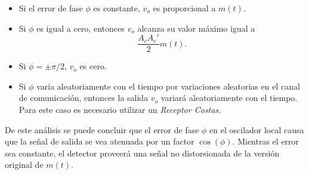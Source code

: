 \begin{itemize}
    \item Si el error de fase $\phi$ es constante, $v_o$ es proporcional a $m(t)$.

    \item Si $\phi$ es igual a cero, entonces $v_o$ alcanza su valor máximo igual a 
    \[
    \frac{A_c A_c'}{2} m(t).
    \]

    \item Si $\phi = \pm \pi/2$, $v_o$ es cero.

    \item Si $\phi$ varía aleatoriamente con el tiempo por variaciones aleatorias en el canal de comunicación, entonces la salida $v_o$ variará aleatoriamente con el tiempo. Para este caso es necesario utilizar un \textit{Receptor Costas}.
\end{itemize}

De este análisis se puede concluir que el error de fase $\phi$ en el oscilador local causa que la señal de salida se vea atenuada por un factor $\cos(\phi)$. Mientras el error sea constante, el detector proveerá una señal no distorsionada de la versión original de $m(t)$.
